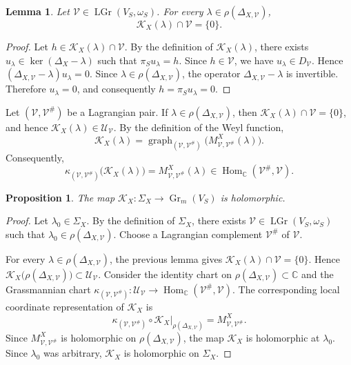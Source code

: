 \documentclass[10pt,a4paper]{amsart}
\newtheorem{lem}[thm]{Lemma}
\newtheorem{prop}[thm]{Proposition}
\numberwithin{equation}{section} \numberwithin{figure}{section}
\newcommand{\mb}[1]{\mathbb{#1}} %
\newcommand{\mc}[1]{\mathcal{#1}}
\begin{document}
\begin{lem}\label{lem:cauchy-data-transverse}
Let \(\mc V\in\operatorname{LGr}(V_S,\omega_S)\). For every
\(\lambda\in\rho(\Delta_{X,\mc V})\),
\[
    \mc K_X(\lambda)\cap\mc V=\{0\}.
\]
\end{lem}

\begin{proof}
Let \(h\in\mc K_X(\lambda)\cap\mc V\). By the definition of
\(\mc K_X(\lambda)\), there exists
\(u_\lambda\in\ker(\Delta_X-\lambda)\) such that
\(\pi_Su_\lambda=h\). Since \(h\in\mc V\), we have
\(u_\lambda\in D_{\mc V}\). Hence
\(
    (\Delta_{X,\mc V}-\lambda)u_\lambda=0.
\)
Since \(\lambda\in\rho(\Delta_{X,\mc V})\),
the operator \(\Delta_{X,\mc V}-\lambda\) is invertible. Therefore
\(u_\lambda=0\), and consequently \(h=\pi_Su_\lambda=0\).
\end{proof}



Let \((\mc V,\mc V^\#)\) be a Lagrangian pair. If
\(\lambda\in\rho(\Delta_{X,\mc V})\), then
\(\mc K_X(\lambda)\cap\mc V=\{0\}\), and hence
\(\mc K_X(\lambda)\in\mc U_{\mc V}\). By the definition of the Weyl
function,
\[
    \mc K_X(\lambda)
    =
    \operatorname{graph}_{(\mc V,\mc V^\#)}
    \bigl(M_{\mc V,\mc V^\#}^X(\lambda)\bigr).
\]
Consequently,
\[
    \kappa_{(\mc V,\mc V^\#)}
    \bigl(\mc K_X(\lambda)\bigr)
    =
    M_{\mc V,\mc V^\#}^X(\lambda)
    \in
    \operatorname{Hom}_{\mb C}(\mc V^\#,\mc V).
\]

\begin{prop}
The map
\(
    \mc K_X:
    \Sigma_X
    \longrightarrow
    \operatorname{Gr}_m(V_S)
\)
is holomorphic.
\end{prop}

\begin{proof}
Let \(\lambda_0\in\Sigma_X\). By the definition of \(\Sigma_X\), there
exists \(\mc V\in\operatorname{LGr}(V_S,\omega_S)\) such that
\(\lambda_0\in\rho(\Delta_{X,\mc V})\). Choose a Lagrangian complement
\(\mc V^\#\) of \(\mc V\).

For every \(\lambda\in\rho(\Delta_{X,\mc V})\), the previous lemma
gives \(\mc K_X(\lambda)\cap\mc V=\{0\}\). Hence
\(
    \mc K_X\bigl(\rho(\Delta_{X,\mc V})\bigr)
    \subset
    \mc U_{\mc V}.
\)
Consider the identity chart on
\(\rho(\Delta_{X,\mc V})\subset\mb C\) and the Grassmannian chart
\(
    \kappa_{(\mc V,\mc V^\#)}:
    \mc U_{\mc V}
    \longrightarrow
    \operatorname{Hom}_{\mb C}(\mc V^\#,\mc V).
\)
The corresponding local coordinate representation of \(\mc K_X\) is
\[
    \kappa_{(\mc V,\mc V^\#)}
    \circ
    \mc K_X\big|_{\rho(\Delta_{X,\mc V})}
    =
    M_{\mc V,\mc V^\#}^X.
\]
Since \(M_{\mc V,\mc V^\#}^X\) is holomorphic on
\(\rho(\Delta_{X,\mc V})\), the map \(\mc K_X\) is holomorphic at
\(\lambda_0\). Since \(\lambda_0\) was arbitrary, \(\mc K_X\) is
holomorphic on \(\Sigma_X\).
\end{proof}
\end{document}
